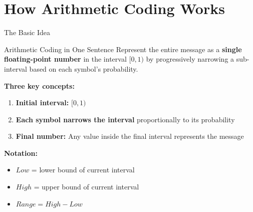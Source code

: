 \documentclass[aspectratio=169,12pt]{beamer}
\begin{document}
\section{How Arithmetic Coding Works}

\begin{frame}{The Basic Idea}
    \begin{block}{Arithmetic Coding in One Sentence}
        Represent the entire message as a \textbf{single floating-point number} in the interval $[0, 1)$ by progressively narrowing a sub-interval based on each symbol's probability.
    \end{block}
    
    \vspace{0.5cm}
    \textbf{Three key concepts:}
    \begin{enumerate}
        \item \textbf{Initial interval:} $[0, 1)$
        \item \textbf{Each symbol narrows the interval} proportionally to its probability
        \item \textbf{Final number:} Any value inside the final interval represents the message
    \end{enumerate}
    
    \vspace{0.3cm}
    \textbf{Notation:}
    \begin{itemize}
        \item $Low$ = lower bound of current interval
        \item $High$ = upper bound of current interval
        \item $Range = High - Low$
    \end{itemize}
\end{frame}
\end{document}
